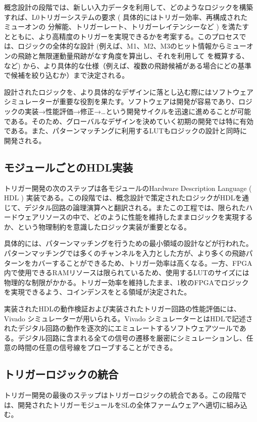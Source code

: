 概念設計の段階では、新しい入力データを利用して、どのようなロジックを構築すれば、L0トリガーシステムの要求 ( 具体的にはトリガー効率、再構成されたミューオンの
\pt 分解能、トリガーレート、トリガーレイテンシーなど ) を満たすとともに、より高精度のトリガーを実現できるかを考案する。このプロセスでは、ロジックの全体的な設計 (例えば、M1、M2、M3のヒット情報からミューオンの飛跡と無限運動量飛跡がなす角度を算出し、それを利用して \pt を概算する、など) から、より具体的な仕様（例えば、複数の飛跡候補がある場合にどの基準で候補を絞り込むか）まで決定される。

設計されたロジックを、より具体的なデザインに落とし込む際にはソフトウェアシミュレーターが重要な役割を果たす。ソフトウェアは開発が容易であり、ロジックの実装→性能評価→修正→…という開発サイクルを迅速に進めることが可能である。そのため、グローバルなデザインを決めていく初期の開発では特に有効である。また、パターンマッチングに利用するLUTもロジックの設計と同時に開発される。

\subsection*{モジュールごとのHDL実装}
トリガー開発の次のステップは各モジュールのHardware Description Language ( HDL ) 実装である。この段階では、概念設計で策定されたロジックがHDLを通じて、デジタル回路の論理演算へと翻訳される。またこの工程では、限られたハードウェアリソースの中で、どのように性能を維持したままロジックを実現するか、という物理制約を意識したロジック実装が重要となる。

具体的には、パターンマッチングを行うための最小領域の設計などが行われた。パターンマッチングでは多くのチャンネルを入力とした方が、より多くの飛跡パターンをカバーすることができるため、トリガー効率は高くなる。一方、FPGA内で使用できるRAMリソースは限られているため、使用するLUTのサイズには物理的な制限がかかる。トリガー効率を維持したまま、1枚のFPGAでロジックを実現できるよう、コインデンスをとる領域が決定された。

実装されたHDLの動作検証および実装されたトリガー回路の性能評価には、Vivado シミュレーターが用いられる。Vivado シミュレーターとはHDLで記述されたデジタル回路の動作を逐次的にエミュレートするソフトウェアツールである。デジタル回路に含まれる全ての信号の遷移を厳密にシミュレーションし、任意の時間の任意の信号線をプローブすることができる。

\subsection*{トリガーロジックの統合}
トリガー開発の最後のステップはトリガーロジックの統合である。この段階では、開発されたトリガーモジュールをSLの全体ファームウェアへ適切に組み込む。

